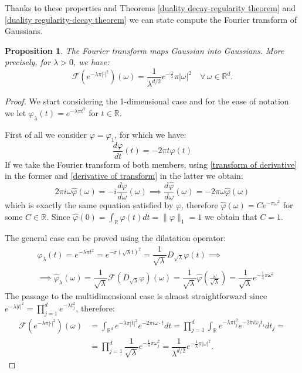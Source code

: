 \documentclass[corpo=11pt, stile=classica, tipotesi=custom,
greek, evenboxes, english]{toptesi}
\numberwithin{equation}{chapter}
\newtheorem{prop}[teo]{Proposition}
\theoremstyle{remark}
\newcommand{\R}{\mathbb{R}} %
\newcommand{\F}{\mathscr{F}} %
\begin{document}
Thanks to these properties and Theorems \ref{duality decay-regularity theorem} and \ref{duality regularity-decay theorem} we can state compute the Fourier transform of Gaussians.
\begin{prop}\label{Fourier transform of Gaussian proposition}
	The Fourier transform maps Gaussian into Gaussians. More precisely, for $\lambda > 0$, we have:
	\begin{equation}\label{Fourier transform of Gaussian formula}
		\F(e^{-\lambda \pi |\cdot|^2})(\omega) = \dfrac{1}{\lambda^{d/2}} e^{-\frac{1}{\lambda}}\pi |\omega|^2 \quad \forall\,\omega \in \R^d.
	\end{equation}
\end{prop}
\begin{proof}
	We start considering the 1-dimensional case and for the ease of notation we let $\varphi_{\lambda}(t) = e^{-\lambda \pi t^2}$ for $t \in \R$.
	
	First of all we consider $\varphi = \varphi_1$, for which we have:
	\begin{equation*}
		\frac{d \varphi}{dt}(t) = -2 \pi t \varphi(t)
	\end{equation*}
	If we take the Fourier transform of both members, using \eqref{transform of derivative} in the former and \eqref{derivative of transform} in the latter we obtain:
	\begin{equation*}
		2 \pi i \omega \hat{\varphi}(\omega) = -i \dfrac{d\hat{\varphi}}{d\omega}(\omega) \implies \dfrac{d\hat{\varphi}}{d\omega}(\omega) = - 2 \pi \omega \hat{\varphi}(\omega)
	\end{equation*}
	which is exactly the same equation satisfied by $\varphi$, therefore $\hat{\varphi}(\omega) = C e^{-\pi \omega^2}$ for some $C \in \R$. Since $\hat{\varphi}(0) = \int_\R \varphi(t)dt = \|\varphi\|_1=1$ we obtain that $C=1$.
	
	The general case can be proved using the dilatation operator:
	\begin{align*}
		&\varphi_{\lambda}(t) = e^{-\lambda \pi t^2} = e^{-\pi \left(\sqrt{\lambda} t\right)^2} = \dfrac{1}{\sqrt{\lambda}} D_{\sqrt{\lambda}}\varphi(t) \implies\\
		                     &\implies \hat{\varphi}_{\lambda}(\omega) = \dfrac{1}{\sqrt{\lambda}} \F ( D_{\sqrt{\lambda}}\varphi )(\omega) = \dfrac{1}{\sqrt{\lambda}} \hat{\varphi}\left(\frac{\omega}{\sqrt{\lambda}}\right) = \dfrac{1}{\sqrt{\lambda}} e^{-\frac{1}{\lambda}\pi\omega^2}
	\end{align*}
	The passage to the multidimensional case is almost straightforward since $e^{-\lambda|t|^2} = \prod_{j=1}^d e^{-\lambda t_j^2}$, therefore:
	\begin{align*}
		\F(e^{-\lambda\pi|\cdot|^2})(\omega) &= \int_{\R^d} e^{-\lambda \pi |t|^2} e^{-2\pi i \omega \cdot t}dt = \prod_{j=1}^d \int_{\R} e^{-\lambda \pi t_j^2} e^{-2\pi i \omega_j t_j} dt_j = \\
										  &= \prod_{j=1}^d \dfrac{1}{\sqrt{\lambda}}e^{-\frac{1}{\lambda}\pi \omega_j^2} = \dfrac{1}{\lambda^{d/2}} e^{-\frac{1}{\lambda}\pi|\omega|^2}.
	\end{align*}
\end{proof}
\end{document}
